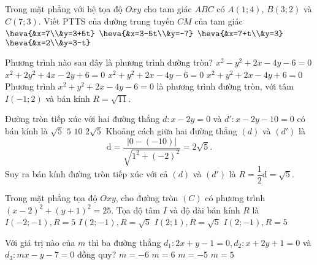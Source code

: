 \begin{ex}%
	Trong mặt phẳng với hệ tọa độ $Oxy$ cho tam giác $ABC$ có  $A(1;4)$, $B(3;2)$ và $C(7;3)$. Viết PTTS của đường trung tuyến $CM$ của tam giác
	\choice
	{$\heva{&x=7\\&y=3+5t}$}
	{$\heva{&x=3-5t\\&y=-7}$}
	{\True $\heva{&x=7+t\\&y=3}$}
	{$\heva{&x=2\\&y=3-t}$}
\end{ex}
\begin{ex}%
	Phương trình nào sau đây là phương trình đường tròn?
	\choice
	{$x^2 - y^2 + 2x - 4y - 6 = 0$}
	{$x^2 + 2y^2 + 4x - 2y + 6 = 0$}
	{\True $x^2 + y^2 + 2x - 4y - 6 = 0$}
	{$x^2 + y^2 + 2x - 4y + 6 = 0$}
	\loigiai
	{
		Phương trình $x^2 + y^2 + 2x - 4y - 6 = 0$ là phương trình đường tròn, với tâm $I(-1;2)$ và bán kính $R = \sqrt{11}$.
	}
\end{ex}
\begin{ex}%
	Đường tròn tiếp xúc với hai đường thẳng $d \colon x - 2y = 0$ và $d'\colon x-2y - 10 = 0$ có bán kính là
	\choice
	{\True $\sqrt{5}$}
	{$5$}
	{$10$}
	{$2\sqrt{5}$}
	\loigiai
	{
		Khoảng cách giữa hai đường thẳng $(d)$ và $\left(d'\right)$ là \[\mathrm{d} = \dfrac{|0-(-10)|}{\sqrt{1^2 + (-2)^2}} = 2\sqrt{5}.\]
		Suy ra bán kính đường tròn tiếp xúc với cả $(d)$ và $\left(d'\right)$ là $R = \dfrac{1}{2}\mathrm{d} = \sqrt{5}$.
	}
\end{ex}
	\begin{ex}%
	Trong mặt phẳng tọa độ $Oxy$, cho đường tròn $(C)$ có phương trình $(x-2)^2+(y+1)^2=25$. Tọa độ tâm $I$ và độ dài bán kính $R$ là
	\choice
	{$I(-2; -1), R=5$}
	{$I(2; -1), R=\sqrt{5}$}
	{$I(2; 1), R=\sqrt 5$}
	{\True $I(2; -1), R=5$}
\end{ex}
\begin{ex}%
	Với giá trị nào của $m$ thì ba đường thẳng $d_{1} \colon 2x+y-1=0, d_{2} \colon x+2y+1=0$ và $d_{3} \colon mx-y-7=0$ đồng quy?
	\choice
	{$m=-6$}
	{\True $m=6$}
	{$m=-5$}
	{$m=5$}
\end{ex}
